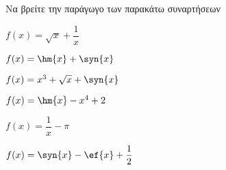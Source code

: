 Να βρείτε την παράγωγο των παρακάτω συναρτήσεων
\begin{multicols}{2}
\begin{alist}
\item $ f(x)=\sqrt{x}+\dfrac{1}{x} $
\item $ f(x)=\hm{x}+\syn{x} $
\item $ f(x)=x^3+\sqrt{x}+\syn{x} $
\item $ f(x)=\hm{x}-x^4+2 $
\item $ f(x)=\dfrac{1}{x}-\pi $
\item $ f(x)=\syn{x}-\ef{x}+\dfrac{1}{2} $
\end{alist}
\end{multicols}
